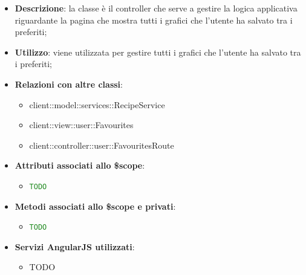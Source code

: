 			\begin{itemize}
				\item \textbf{Descrizione}: la classe è il controller che serve a gestire la logica applicativa riguardante la pagina che mostra tutti i grafici che l'utente ha salvato tra i preferiti;
				\item \textbf{Utilizzo}: viene utilizzata per gestire tutti i grafici che l'utente ha salvato tra i preferiti;
				\item \textbf{Relazioni con altre classi}:
					\begin{itemize}
						\item client::model::services::RecipeService
						\item client::view::user::Favourites
						\item client::controller::user::FavouritesRoute
					\end{itemize}

				\item \textbf{Attributi associati allo \$scope}:
					\begin{itemize}
						\item \textcolor{forestgreen}{\texttt{TODO}}

					\end{itemize}

				\item \textbf{Metodi associati allo \$scope e privati}:
					\begin{itemize}
						\item \textcolor{forestgreen}{\texttt{TODO}}

					\end{itemize}

				\item \textbf{Servizi AngularJS utilizzati}:
					\begin{itemize}
						\item TODO
					\end{itemize}

			\end{itemize}

